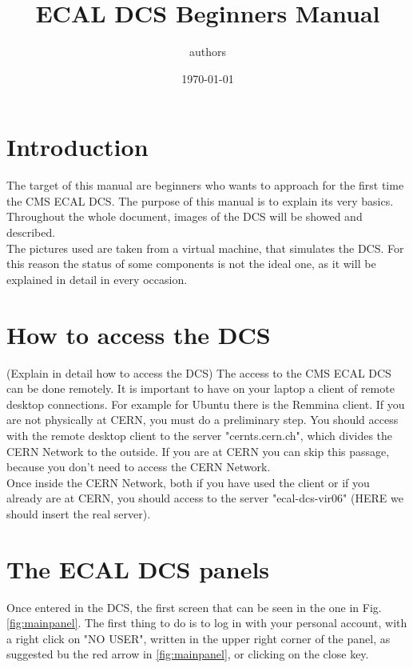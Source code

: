 \documentclass[12pt]{article}
\title{\huge ECAL DCS Beginners Manual}
\author{authors}
\date{\today}
\begin{document}
\maketitle

\newpage
\tableofcontents
\newpage


\section{Introduction}

\justifying
The target of this manual are beginners who wants to approach for the first time the CMS ECAL DCS. The purpose of this manual is to explain its very basics. Throughout the whole document, images of the DCS will be showed and described. \\

The pictures used are taken from a virtual machine, that simulates the DCS. For this reason the status of some components is not the ideal one, as it will be explained in detail in every occasion. 

 
\newpage
\section{How to access the DCS}

(Explain in detail how to access the DCS)
The access to the CMS ECAL DCS can be done remotely. It is important to have on your laptop a client of remote desktop connections. For example for Ubuntu there is the Remmina client. 
If you are not physically at CERN, you must do a preliminary step. You should access with the remote desktop client to the server "cernts.cern.ch", which divides the CERN Network to the outside. If you are at CERN you can skip this passage, because you don't need to access the CERN Network.\\
Once inside the CERN Network, both if you have used the client or if you already are at CERN, you should access to the server "ecal-dcs-vir06" (HERE we should insert the real server).


\section{The ECAL DCS panels}
Once entered in the DCS, the first screen that can be seen in the one in Fig. \ref{fig:mainpanel}. The first thing to do is to log in with your personal account, with a right click on "NO USER", written in the upper right corner of the panel, as suggested bu the red arrow in \ref{fig:mainpanel}, or clicking on the close key.  
\end{document}
